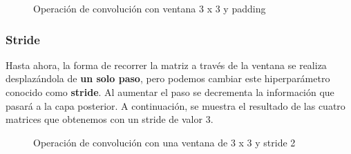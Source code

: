 \documentclass[
  a4paper,
  DIV=11,
  numbers=noendperiod]{scrreprt}
\begin{document}
\begin{figure}


\caption{\label{fig-con-padding}Operación de convolución con ventana 3 x
3 y padding}

\end{figure}%

\subsubsection{Stride}\label{stride}

Hasta ahora, la forma de recorrer la matriz a través de la ventana se
realiza desplazándola de \textbf{un solo paso}, pero podemos cambiar
este hiperparámetro conocido como \textbf{stride}. Al aumentar el paso
se decrementa la información que pasará a la capa posterior. A
continuación, se muestra el resultado de las cuatro matrices que
obtenemos con un stride de valor 3.

\begin{figure}


\caption{\label{fig-con-stride2}Operación de convolución con una ventana
de 3 x 3 y stride 2}

\end{figure}%
\end{document}
